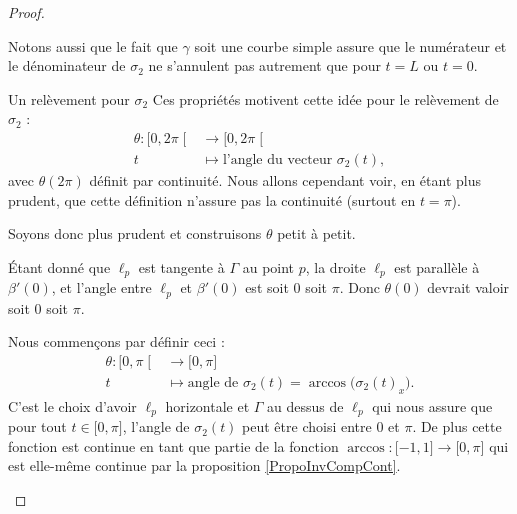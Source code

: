 \begin{proof}
\begin{subproof}
            Notons aussi que le fait que \( \gamma\) soit une courbe simple assure que le numérateur et le dénominateur de \( \sigma_2\) ne s'annulent pas autrement que pour \( t=L\) ou \( t=0\).
            
        \item[Un relèvement pour \( \sigma_2\)]
            Ces propriétés motivent cette idée pour le relèvement de \( \sigma_2\) :
            \begin{equation}
                \begin{aligned}
                    \theta\colon \mathopen[ 0 , 2\pi \mathclose[&\to\mathopen[ 0 , 2\pi \mathclose[  \\
                        t&\mapsto \text{l'angle du vecteur } \sigma_2(t),
                \end{aligned}
            \end{equation}
            avec \( \theta(2\pi)\) définit par continuité. Nous allons cependant voir, en étant plus prudent, que cette définition n'assure pas la continuité (surtout en \( t=\pi\)).

            Soyons donc plus prudent et construisons \( \theta\) petit à petit.

            Étant donné que \( \ell_p\) est tangente à \( \Gamma\) au point \(p \), la droite \( \ell_p\) est parallèle à \( \beta'(0)\), et l'angle entre \( \ell_p\) et \( \beta'(0)\) est soit \( 0\) soit \( \pi\). Donc \( \theta(0)\) devrait valoir soit \(0\) soit \(\pi\).

            Nous commençons par définir ceci :
            \begin{equation}
                \begin{aligned}
                    \theta\colon \mathopen[ 0 , \pi \mathclose[&\to \mathopen[ 0 , \pi \mathclose] \\
                    t&\mapsto \text{angle de } \sigma_2(t)=\arccos\big(  \sigma_2(t)_x   \big). 
                \end{aligned}
            \end{equation}
            C'est le choix d'avoir \( \ell_p\) horizontale et \( \Gamma\) au dessus de \( \ell_p\) qui nous assure que pour tout \( t\in\mathopen[ 0 , \pi \mathclose]\), l'angle de \( \sigma_2(t)\) peut être choisi entre \( 0\) et \( \pi\). De plus cette fonction est continue en tant que partie de la fonction \( \arccos\colon \mathopen[ -1 , 1 \mathclose]\to \mathopen[ 0 , \pi \mathclose]\) qui est elle-même continue par la proposition \ref{PropoInvCompCont}.


\end{subproof}
\end{proof}
